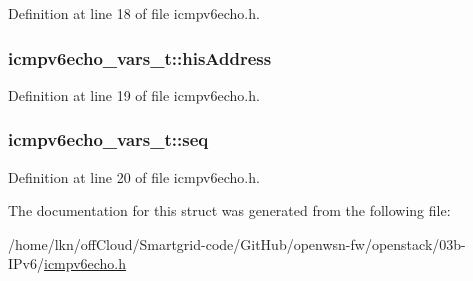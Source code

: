 Definition at line 18 of file icmpv6echo.\+h.

\subsubsection[{\texorpdfstring{his\+Address}{hisAddress}}]{ icmpv6echo\+\_\+vars\+\_\+t\+::his\+Address}\hypertarget{structicmpv6echo__vars__t_a048b2759f15b3c5deebf931c5dedbe0e}{}\label{structicmpv6echo__vars__t_a048b2759f15b3c5deebf931c5dedbe0e}


Definition at line 19 of file icmpv6echo.\+h.

\subsubsection[{\texorpdfstring{seq}{seq}}]{ icmpv6echo\+\_\+vars\+\_\+t\+::seq}\hypertarget{structicmpv6echo__vars__t_a879e3cd4c2b8d5de0dd45a8912a6ba3c}{}\label{structicmpv6echo__vars__t_a879e3cd4c2b8d5de0dd45a8912a6ba3c}


Definition at line 20 of file icmpv6echo.\+h.



The documentation for this struct was generated from the following file\+:\begin{DoxyCompactItemize}
\item 
/home/lkn/off\+Cloud/\+Smartgrid-\/code/\+Git\+Hub/openwsn-\/fw/openstack/03b-\/\+I\+Pv6/\hyperlink{icmpv6echo_8h}{icmpv6echo.\+h}\end{DoxyCompactItemize}
